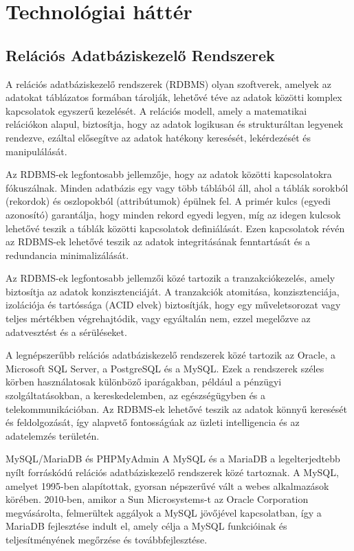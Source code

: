 \documentclass[colorlinks]{thesis-kando}
\theoremstyle{definition}
\theoremstyle{remark}
\begin{document}
\chapter{Technológiai háttér}

\section{Relációs Adatbáziskezelő Rendszerek}

A relációs adatbáziskezelő rendszerek (RDBMS) olyan szoftverek, amelyek az adatokat táblázatos formában tárolják, lehetővé téve az adatok közötti komplex kapcsolatok egyszerű kezelését. A relációs modell, amely a matematikai relációkon alapul, biztosítja, hogy az adatok logikusan és strukturáltan legyenek rendezve, ezáltal elősegítve az adatok hatékony keresését, lekérdezését és manipulálását.

Az RDBMS-ek legfontosabb jellemzője, hogy az adatok közötti kapcsolatokra fókuszálnak. Minden adatbázis egy vagy több táblából áll, ahol a táblák sorokból (rekordok) és oszlopokból (attribútumok) épülnek fel. A primér kulcs (egyedi azonosító) garantálja, hogy minden rekord egyedi legyen, míg az idegen kulcsok lehetővé teszik a táblák közötti kapcsolatok definiálását. Ezen kapcsolatok révén az RDBMS-ek lehetővé teszik az adatok integritásának fenntartását és a redundancia minimalizálását.

Az RDBMS-ek legfontosabb jellemzői közé tartozik a tranzakciókezelés, amely biztosítja az adatok konzisztenciáját. A tranzakciók atomitása, konzisztenciája, izolációja és tartóssága (ACID elvek) biztosítják, hogy egy műveletsorozat vagy teljes mértékben végrehajtódik, vagy egyáltalán nem, ezzel megelőzve az adatvesztést és a sérüléseket.

A legnépszerűbb relációs adatbáziskezelő rendszerek közé tartozik az Oracle, a Microsoft SQL Server, a PostgreSQL és a MySQL. Ezek a rendszerek széles körben használatosak különböző iparágakban, például a pénzügyi szolgáltatásokban, a kereskedelemben, az egészségügyben és a telekommunikációban. Az RDBMS-ek lehetővé teszik az adatok könnyű keresését és feldolgozását, így alapvető fontosságúak az üzleti intelligencia és az adatelemzés területén.

MySQL/MariaDB és PHPMyAdmin
A MySQL és a MariaDB a legelterjedtebb nyílt forráskódú relációs adatbáziskezelő rendszerek közé tartoznak. A MySQL, amelyet 1995-ben alapítottak, gyorsan népszerűvé vált a webes alkalmazások körében. 2010-ben, amikor a Sun Microsystems-t az Oracle Corporation megvásárolta, felmerültek aggályok a MySQL jövőjével kapcsolatban, így a MariaDB fejlesztése indult el, amely célja a MySQL funkcióinak és teljesítményének megőrzése és továbbfejlesztése.
\end{document}
